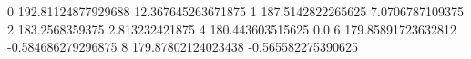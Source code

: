0 192.81124877929688 12.367645263671875
1 187.5142822265625 7.0706787109375
2 183.2568359375 2.813232421875
4 180.443603515625 0.0
6 179.85891723632812 -0.584686279296875
8 179.87802124023438 -0.565582275390625
